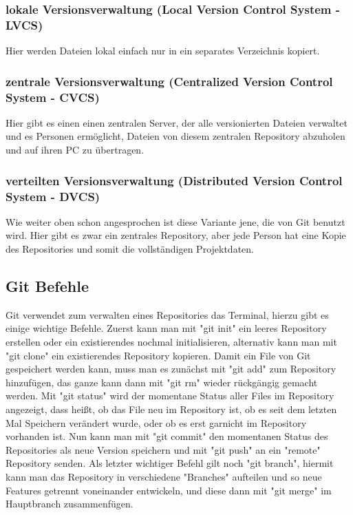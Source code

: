 \subsubsection{lokale Versionsverwaltung (Local Version Control System - LVCS)}
Hier werden Dateien lokal einfach nur in ein separates Verzeichnis kopiert.
\cite{sysarch-git-2}

\subsubsection{zentrale Versionsverwaltung (Centralized Version Control System - CVCS)}
Hier gibt es einen einen zentralen Server, der alle versionierten Dateien verwaltet und es Personen ermöglicht, 
Dateien von diesem zentralen Repository abzuholen und auf ihren PC zu übertragen.
\cite{sysarch-git-2}

\subsubsection{verteilten Versionsverwaltung (Distributed Version Control System - DVCS)}
Wie weiter oben schon angesprochen ist diese Variante jene, die von Git benutzt wird. Hier gibt es zwar ein zentrales Repository, 
aber jede Person  hat eine Kopie des Repositories und somit die vollständigen Projektdaten.
\cite{sysarch-git-2}

\subsection{Git Befehle}

Git verwendet zum verwalten eines Repositories das Terminal, hierzu gibt es einige wichtige Befehle. Zuerst kann man mit "git init" ein leeres Repository erstellen 
oder ein existierendes nochmal initialisieren, alternativ kann man mit "git clone" ein existierendes Repository kopieren. Damit ein File von Git gespeichert werden
kann, muss man es zunächst mit "git add" zum Repository hinzufügen, das ganze kann dann mit "git rm" wieder rückgängig gemacht werden. Mit "git status" wird der 
momentane Status aller Files im Repository angezeigt, dass heißt, ob das File neu im Repository ist, ob es seit dem letzten Mal Speichern verändert wurde, oder ob es 
erst garnicht im Repository vorhanden ist. Nun kann man mit "git commit" den momentanen Status des Repositories als neue Version speichern und mit "git push" an ein "remote" 
Repository senden. Als letzter wichtiger Befehl gilt noch "git branch", hiermit kann man das Repository in verschiedene "Branches" aufteilen und so 
neue Features getrennt voneinander entwickeln, und diese dann mit "git merge" im Hauptbranch zusammenfügen.
\cite{sysarch-git-2}

